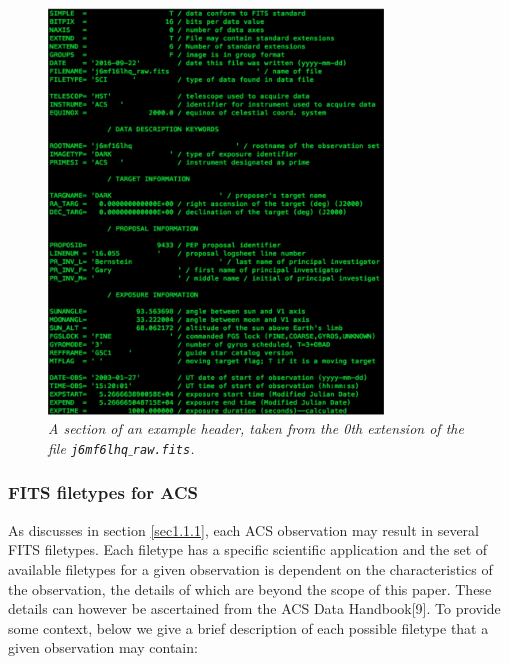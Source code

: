\documentclass[10pt,journal,compsoc]{IEEEtran}
\begin{document}
\begin{figure}[!h]
\centering
\includegraphics[width=3.5in]{./figures/header_example.png}
\caption{\textit{A section of an example header, taken from the 0th extension of the file \texttt{j6mf6lhq$\_$raw.fits}.}}
\label{fig2}
\end{figure}


\subsubsection{FITS filetypes for ACS} \label{sec1.1.4}

As discusses in section \ref{sec1.1.1}, each ACS observation may result in several FITS filetypes. Each filetype has a specific scientific application and
the set of available filetypes for a given observation is dependent on the characteristics of the observation, the details of which are beyond the scope of this
paper.  These details can however be ascertained from the ACS Data Handbook[9].  To provide some context, below we give a brief description of each possible
filetype that a given observation may contain:
\end{document}
